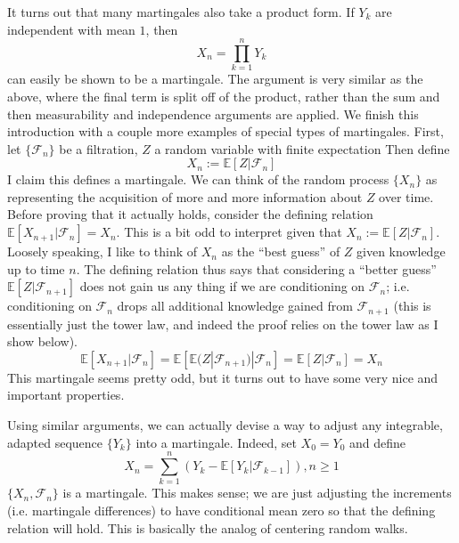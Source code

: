 \documentclass[12pt]{article}
\newcommand{\E}{\mathbb{E}}
\begin{document}
It turns out that many martingales also take a product form. If $Y_k$ are independent with mean $1$, then 
\[X_n = \prod_{k = 1}^{n} Y_k\]
can easily be shown to be a martingale. The argument is very similar as the above, where the final term is split off of the product, rather than the sum and then measurability and independence 
arguments are applied. We finish this introduction with a couple more examples of special types of martingales. First, let $\{\mathcal{F}_n\}$ be a filtration, $Z$ a random variable with finite 
expectation Then define 
\[X_n := \E[Z|\mathcal{F}_n]\]
I claim this defines a martingale. We can think of the random process $\{X_n\}$ as representing the acquisition of more and more information about $Z$ over time. Before proving that it actually holds, 
consider the defining relation $\E[X_{n+1} |\mathcal{F}_n] = X_n$. This is a bit odd to interpret given that $X_n := \E[Z|\mathcal{F}_n]$. Loosely speaking, I like to think of $X_n$ as the ``best guess'' of 
$Z$ given knowledge up to time $n$. The defining relation thus says that considering a ``better guess'' $\E[Z|\mathcal{F}_{n+1}]$ does not gain us any thing if we are conditioning on $\mathcal{F}_n$; i.e.
conditioning on $\mathcal{F}_n$ drops all additional knowledge gained from $\mathcal{F}_{n+1}$ (this is essentially just the tower law, and indeed the proof relies on the tower law as I show below).
\[\E[X_{n + 1}|\mathcal{F}_n] = \E[\E(Z|\mathcal{F}_{n+1})|\mathcal{F}_n] = \E[Z|\mathcal{F}_n] = X_n\] 
This martingale seems pretty odd, but it turns out to have some very nice and important properties. 

Using similar arguments, we can actually devise a way to adjust any integrable, adapted sequence $\{Y_k\}$ into a martingale. Indeed, set $X_0 = Y_0$ and define 
\[X_n = \sum_{k = 1}^{n} \left(Y_k - \E[Y_k|\mathcal{F}_{k-1}] \right), n \geq 1\]
$\{X_n, \mathcal{F}_n\}$ is a martingale. This makes sense; we are just adjusting the increments (i.e. martingale differences) to have conditional mean zero so that the defining relation 
will hold. This is basically the analog of centering random walks. 
\end{document}
